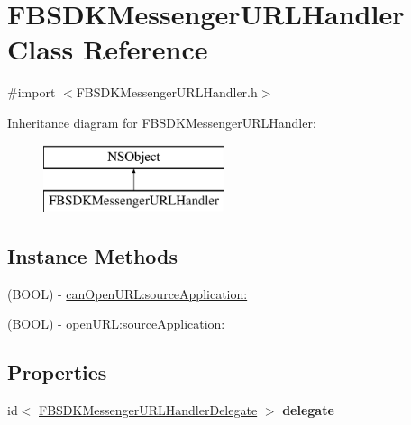\hypertarget{interface_f_b_s_d_k_messenger_u_r_l_handler}{}\section{F\+B\+S\+D\+K\+Messenger\+U\+R\+L\+Handler Class Reference}
\label{interface_f_b_s_d_k_messenger_u_r_l_handler}


{\ttfamily \#import $<$F\+B\+S\+D\+K\+Messenger\+U\+R\+L\+Handler.\+h$>$}

Inheritance diagram for F\+B\+S\+D\+K\+Messenger\+U\+R\+L\+Handler\+:\begin{figure}[H]
\begin{center}
\leavevmode
\includegraphics[height=2.000000cm]{interface_f_b_s_d_k_messenger_u_r_l_handler}
\end{center}
\end{figure}
\subsection*{Instance Methods}
\begin{DoxyCompactItemize}
\item 
(B\+O\+O\+L) -\/ \hyperlink{interface_f_b_s_d_k_messenger_u_r_l_handler_a060d742ac76d48fb08a51761c997cf2a}{can\+Open\+U\+R\+L\+:source\+Application\+:}
\item 
(B\+O\+O\+L) -\/ \hyperlink{interface_f_b_s_d_k_messenger_u_r_l_handler_ab1af9ca06f46d9d92c3c36b24f42f189}{open\+U\+R\+L\+:source\+Application\+:}
\end{DoxyCompactItemize}
\subsection*{Properties}
\begin{DoxyCompactItemize}
\item 
\hypertarget{interface_f_b_s_d_k_messenger_u_r_l_handler_af5b440260a6e4ec1afd003cb0311a49c}{}id$<$ \hyperlink{protocol_f_b_s_d_k_messenger_u_r_l_handler_delegate-p}{F\+B\+S\+D\+K\+Messenger\+U\+R\+L\+Handler\+Delegate} $>$ {\bfseries delegate}\label{interface_f_b_s_d_k_messenger_u_r_l_handler_af5b440260a6e4ec1afd003cb0311a49c}

\end{DoxyCompactItemize}


